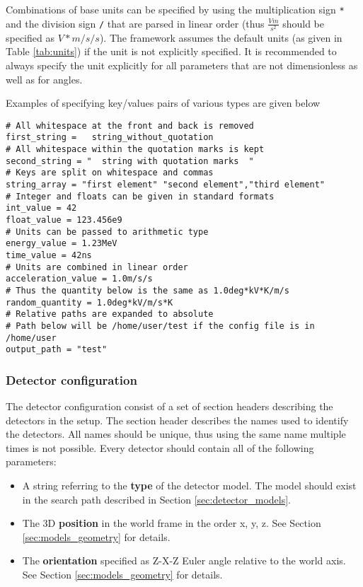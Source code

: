 Combinations of base units can be specified by using the multiplication sign \texttt{*} and the division sign \texttt{/} that are parsed in linear order (thus $\frac{V m}{s^2}$ should be specified as $V*m/s/s$). The framework assumes the default units (as given in Table \ref{tab:units}) if the unit is not explicitly specified. It is recommended to always specify the unit explicitly for all parameters that are not dimensionless as well as for angles.

Examples of specifying key/values pairs of various types are given below
\begin{verbatim}
# All whitespace at the front and back is removed
first_string =   string_without_quotation  
# All whitespace within the quotation marks is kept
second_string = "  string with quotation marks  "
# Keys are split on whitespace and commas
string_array = "first element" "second element","third element"
# Integer and floats can be given in standard formats
int_value = 42
float_value = 123.456e9
# Units can be passed to arithmetic type
energy_value = 1.23MeV
time_value = 42ns
# Units are combined in linear order
acceleration_value = 1.0m/s/s
# Thus the quantity below is the same as 1.0deg*kV*K/m/s
random_quantity = 1.0deg*kV/m/s*K 
# Relative paths are expanded to absolute 
# Path below will be /home/user/test if the config file is in /home/user
output_path = "test" 
\end{verbatim}

\subsubsection{Detector configuration}
\label{sec:detector_config}
The detector configuration consist of a set of section headers describing the detectors in the setup. The section header describes the names used to identify the detectors. All names should be unique, thus using the same name multiple times is not possible. Every detector should contain all of the following parameters:
\begin{itemize}
\item A string referring to the \textbf{type} of the detector model. The model should exist in the search path described in Section \ref{sec:detector_models}.
\item The 3D \textbf{position} in the world frame in the order x, y, z. See Section \ref{sec:models_geometry} for details.
\item The \textbf{orientation} specified as Z-X-Z Euler angle relative to the world axis. See Section \ref{sec:models_geometry} for details.
\end{itemize}

